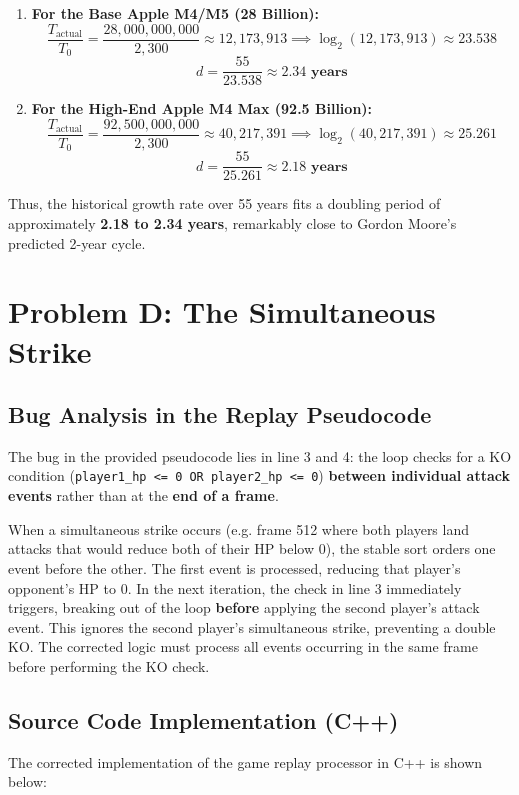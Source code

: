 \documentclass[11pt,a4paper]{article}
\begin{document}
\begin{enumerate}
    \item \textbf{For the Base Apple M4/M5 (28 Billion):}
    \[ \frac{T_{\text{actual}}}{T_0} = \frac{28,000,000,000}{2,300} \approx 12,173,913 \implies \log_2(12,173,913) \approx 23.538 \]
    \[ d = \frac{55}{23.538} \approx \mathbf{2.34\text{ years}} \]
    
    \item \textbf{For the High-End Apple M4 Max (92.5 Billion):}
    \[ \frac{T_{\text{actual}}}{T_0} = \frac{92,500,000,000}{2,300} \approx 40,217,391 \implies \log_2(40,217,391) \approx 25.261 \]
    \[ d = \frac{55}{25.261} \approx \mathbf{2.18\text{ years}} \]
\end{enumerate}
Thus, the historical growth rate over 55 years fits a doubling period of approximately \textbf{2.18 to 2.34 years}, remarkably close to Gordon Moore's predicted 2-year cycle.

\newpage

\section{Problem D: The Simultaneous Strike}

\subsection{Bug Analysis in the Replay Pseudocode}
The bug in the provided pseudocode lies in line 3 and 4: the loop checks for a KO condition (\texttt{player1\_hp <= 0 OR player2\_hp <= 0}) \textbf{between individual attack events} rather than at the \textbf{end of a frame}. 

When a simultaneous strike occurs (e.g. frame 512 where both players land attacks that would reduce both of their HP below 0), the stable sort orders one event before the other. The first event is processed, reducing that player's opponent's HP to 0. In the next iteration, the check in line 3 immediately triggers, breaking out of the loop \textbf{before} applying the second player's attack event. This ignores the second player's simultaneous strike, preventing a double KO. The corrected logic must process all events occurring in the same frame before performing the KO check.

\subsection{Source Code Implementation (C++)}
The corrected implementation of the game replay processor in C++ is shown below:
\end{document}
